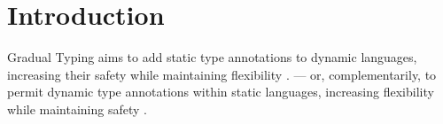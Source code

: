 \documentclass[sigplan,10pt,review,screen]{acmart}\settopmatter{printfolios=true}
\begin{document}
\maketitle


\section{Introduction}


Gradual Typing aims to add static type annotations to dynamic languages, increasing
their safety while maintaining flexibility
\citep{GiladPluggable2004,Siek2006,XXXSiek2015}. 
--- or, complementarily,
to permit dynamic type annotations within static languages, increasing
flexibility while maintaining safety
\citep{AbadiTOPLAS1991}.
\end{document}
